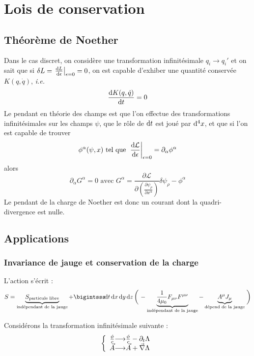\section{Lois de conservation}
\subsection{Théorème de Noether}
Dans le cas discret, on considère une transformation infinitésimale $q_i\longrightarrow q_i'$ et on sait que si $\delta L=\left.\frac{\mathrm{d} L}{\mathrm{d} \epsilon}\right|_{\epsilon=0}=0$, on est capable d'exhiber une quantité conservée $K(q,\dot{q})$, \emph{i.e.}
$$
	\frac{\mathrm{d} K(q,\dot{q})}{\mathrm{d} t}=0
$$
Le pendant en théorie des champs est que l'on effectue des transformations infinitésimales sur les champs $\psi$, que le rôle de $\mathrm{d} t$ est joué par $\mathrm{d}^4x$, et que si l'on est capable de trouver
$$
	\phi^\alpha(\psi,x) \text{ tel que } \left.\frac{\mathrm{d} \mathcal{L}}{\mathrm{d}\epsilon}\right|_{\epsilon=0}=\partial_\alpha \phi^\alpha
$$
alors
$$
	\partial_\alpha G^\alpha=0 \text{ avec } G^\alpha=\frac{\partial \mathcal{L}}{\partial\left(\frac{\partial\psi_\rho}{\partial x^\alpha}\right)}\delta\psi_\rho-\phi^\alpha
$$
Le pendant de la charge de Noether est donc un courant dont la quadri-divergence est nulle.

\subsection{Applications}
\subsubsection{Invariance de jauge et conservation de la charge}
L'action s'écrit :
$$
	S=\underbrace{S_{\text{particule libre}}}_{\text{indépendant de la jauge}}
	+\bigintsss\!\dif t\,\dif x\,\dif y\,\dif z\left(\vphantom{\frac{1}{4}}\right.
	-\underbrace{\frac{1}{4\mu_0}F_{\mu\nu}F^{\mu\nu}}_{\text{indépendant de la jauge}}
	-\underbrace{A^\mu J_\mu}_{\text{dépend de la jauge}}\left.\vphantom{\frac{1}{4}}\right)
$$

Considérons la transformation infinitésimale suivante :
$$
	\left\{\begin{array}{r@{\longrightarrow}l}
		\frac{\phi}{c}&\frac{\phi}{c}-\partial_t\Lambda\\
		\vec{A}&\vec{A}+\nab\Lambda
	\end{array}\right.
$$

